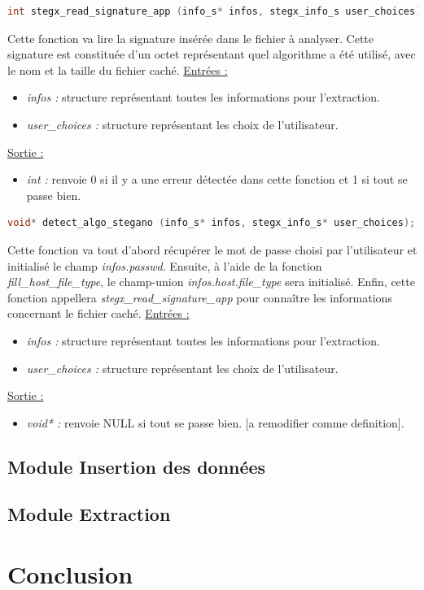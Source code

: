 \documentclass[11pt]{article}
\begin{document}
\begin{lstlisting}[language=c]
int stegx_read_signature_app (info_s* infos, stegx_info_s user_choices); 
\end{lstlisting}

Cette fonction va lire la signature insérée dans le fichier à analyser. 
Cette signature est constituée d'un octet représentant quel algorithme a 
été utilisé, avec le nom et la taille du fichier caché.  
\newline
\underline{Entrées :} 
\begin{itemize}
\item \textit{infos :} structure représentant toutes les informations pour 
l'extraction.  
\item \textit{user\_choices :} structure représentant les choix de 
l'utilisateur. 
\end{itemize}
\underline{Sortie :} 
\begin{itemize}
\item \textit{int :} renvoie 0 si il y a une erreur détectée dans cette 
fonction et 1 si tout se passe bien.  
\newline 
\end{itemize}

\begin{lstlisting}[language=c]
void* detect_algo_stegano (info_s* infos, stegx_info_s* user_choices); 
\end{lstlisting}

Cette fonction va tout d'abord récupérer le mot de passe choisi par 
l'utilisateur et initialisé le champ \textit{infos.passwd}. Ensuite, à 
l'aide de la fonction \textit{fill\_host\_file\_type}, le champ-union 
\textit{infos.host.file\_type} sera initialisé. Enfin, cette fonction appellera 
\textit{stegx\_read\_signature\_app} pour connaître les informations concernant 
le fichier caché. 
\newline
\underline{Entrées :} 
\begin{itemize}
\item \textit{infos :} structure représentant toutes les informations pour 
l'extraction.  
\item \textit{user\_choices :} structure représentant les choix de 
l'utilisateur. 
\end{itemize}
\underline{Sortie :} 
\begin{itemize}
\item \textit{void* :} renvoie NULL si tout se passe bien. [a remodifier 
comme definition]. 
\newline 
\end{itemize}

\subsection{Module Insertion des données}
\subsection{Module Extraction}

\section{Conclusion}
\end{document}
